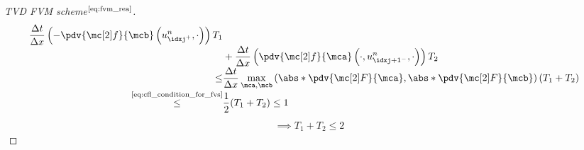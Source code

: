 \begin{proofbox}
\begin{proof}[TVD FVM scheme$^{\text{\cref{eq:fvm_rea}}}$]
\begin{align*}
          \frac{\Delta t}{\Delta x}
          \left(-\pdv{\flux}{\mcb} \left(u_{\idxj^{+}}^{n},\cdot\right)\right)T_{1}\\[-1\jot]
          &+\frac{\Delta t}{\Delta x}\left(\pdv{\flux}{\mca} \left(\cdot,u_{\idxj+1^{-}}^{n},\cdot\right)\right)T_{2}\\[-1\jot]
          \leq&\frac{\Delta t}{\Delta x}\max_{\mca,\mcb}\left(\abs*{\pdv{\Flux}{\mca}},\abs*{\pdv{\Flux}{\mcb}}\right)(T_{1}+T_{2})\\[-1\jot]
          \stackrel{{\text{\cref{eq:cfl_condition_for_fvs}}}}{\leq}&\frac{1}{2}(T_{1}+T_{2})\leq1
        \end{align*}
        \begin{align*}
          \implies T_{1}+T_{2}\leq2
        \end{align*}
    \end{proof}
\end{proofbox}

